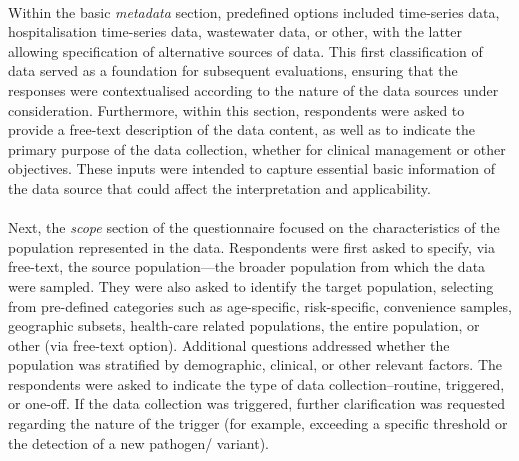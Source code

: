 \documentclass{article}
\begin{document}
\paragraph{}Within the basic \textit{metadata} section, predefined options included time-series data, hospitalisation time-series data, wastewater data, or other, with the latter allowing specification of alternative sources of data. This first classification of data served as a foundation for subsequent evaluations, ensuring that the responses were contextualised according to the nature of the data sources under consideration. Furthermore, within this section, respondents were asked to provide a free-text description of the data content, as well as to indicate the primary purpose of the data collection, whether for clinical management or other objectives. These inputs were intended to capture essential basic information of the data source that could affect the interpretation and applicability. 

\paragraph{}Next, the \textit{scope} section of the questionnaire focused on the characteristics of the population represented in the data. Respondents were first asked to specify, via free-text, the source population---the broader population from which the data were sampled. They were also asked to identify the target population, selecting from pre-defined categories such as age-specific, risk-specific, convenience samples, geographic subsets, health-care related populations, the entire population, or other (via free-text option). Additional questions addressed whether the population was stratified by demographic, clinical, or other relevant factors. The respondents were asked to indicate the type of data collection--routine, triggered, or one-off. If the data collection was triggered, further clarification was requested regarding the nature of the trigger (for example, exceeding a specific threshold or the detection of a new pathogen/ variant). 
\end{document}
